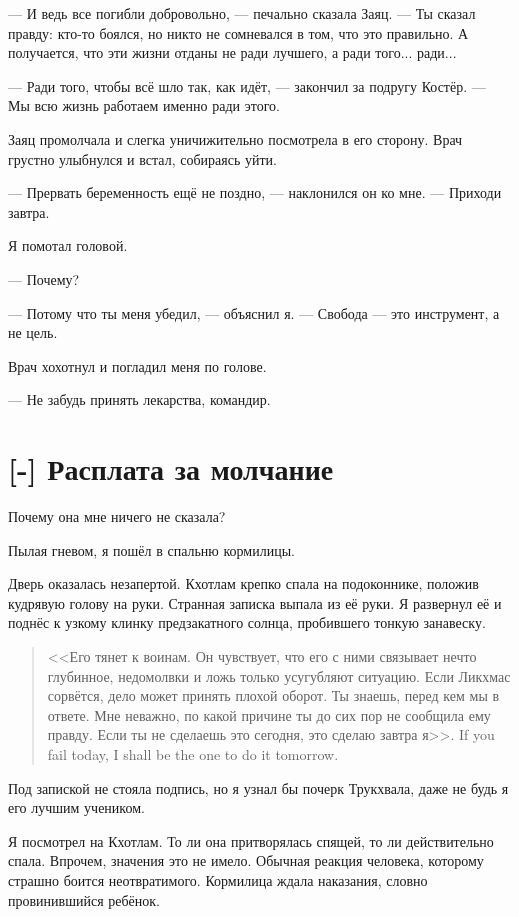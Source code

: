 --- И ведь все погибли добровольно, --- печально сказала Заяц.
--- Ты сказал правду: кто-то боялся, но никто не сомневался в том, что это правильно.
А получается, что эти жизни отданы не ради лучшего, а ради того... ради...

--- Ради того, чтобы всё шло так, как идёт, --- закончил за подругу Костёр.
--- Мы всю жизнь работаем именно ради этого.

Заяц промолчала и слегка уничижительно посмотрела в его сторону.
Врач грустно улыбнулся и встал, собираясь уйти.

--- Прервать беременность ещё не поздно, --- наклонился он ко мне.
--- Приходи завтра.

Я помотал головой.

--- Почему?

--- Потому что ты меня убедил, --- объяснил я.
--- Свобода --- это инструмент, а не цель.

Врач хохотнул и погладил меня по голове.

--- Не забудь принять лекарства, командир.

\section{[-] Расплата за молчание}

\textspace

Почему она мне ничего не сказала?

Пылая гневом, я пошёл в спальню кормилицы.

Дверь оказалась незапертой.
Кхотлам крепко спала на подоконнике, положив кудрявую голову на руки.
Странная записка выпала из её руки.
Я развернул её и поднёс к узкому клинку предзакатного солнца, пробившего тонкую занавеску.

\begin{quote}
<<Его тянет к воинам.
Он чувствует, что его с ними связывает нечто глубинное, недомолвки и ложь только усугубляют ситуацию.
Если Ликхмас сорвётся, дело может принять плохой оборот.
Ты знаешь, перед кем мы в ответе.
Мне неважно, по какой причине ты до сих пор не сообщила ему правду.
{Если ты не сделаешь это сегодня, это сделаю завтра я>>.}
{If you fail today, I shall be the one to do it tomorrow.}
\end{quote}

Под запиской не стояла подпись, но я узнал бы почерк Трукхвала, даже не будь я его лучшим учеником.

Я посмотрел на Кхотлам.
То ли она притворялась спящей, то ли действительно спала.
Впрочем, значения это не имело.
Обычная реакция человека, которому страшно боится неотвратимого.
Кормилица ждала наказания, словно провинившийся ребёнок.

